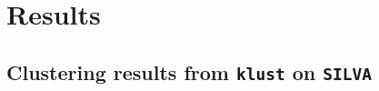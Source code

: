 \section{Results}

%
%
%
%
%
%
%
%


\subsection{Clustering results from \texttt{klust} on \texttt{SILVA}}
\label{app:klust_data_parameters}

